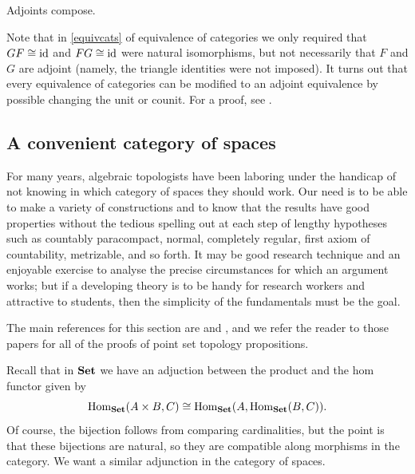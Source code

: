 \documentclass{article}[11pt]
\begin{document}
\begin{proposition} Adjoints compose.
\end{proposition}

Note that in \autoref{equivcats} of equivalence of categories we only required that $GF\cong\text{id} $ and $FG\cong \text{id}$ were natural isomorphisms, but not necessarily that $F$ and $G$ are adjoint (namely, the triangle identities were not imposed). It turns out that every equivalence of categories can be modified to an adjoint equivalence by possible changing the unit or counit. For a proof, see \cite[Lemma 3.10]{mehrle}.


\subsection{A convenient category of spaces}

\epigraph{For many years, algebraic topologists have been laboring under the handicap of not knowing in which category of spaces they should work. Our need is to be able to make a variety of constructions and to know that the results have good properties without the tedious spelling out at each step of lengthy hypotheses such as countably paracompact, normal, completely regular, first axiom of countability, metrizable, and so forth. It may be good research technique and an enjoyable exercise to analyse the precise circumstances for which an argument works; but if a developing theory is to be handy for research workers and attractive to students, then the simplicity of the fundamentals must be the goal.}{\cite{Steenrod-convenient-cat}}

The main references for this section are \cite{Steenrod-convenient-cat} and \cite{Strickland-cgwh}, and we refer the reader to those papers for all of the proofs of point set topology propositions. 

Recall that in $\textbf{Set}$ we have an adjuction between the product and the hom functor given by 
$$\textup{Hom}_{\textbf{Set}}(A\times B, C)\cong \textup{Hom}_{\textbf{Set}} (A, \textup{Hom}_{\textbf{Set}}(B,C)).$$ Of course, the bijection follows from comparing cardinalities, but the point is that these bijections are natural, so they are compatible along morphisms in the category. We want a similar adjunction in the category of spaces. 
\end{document}
